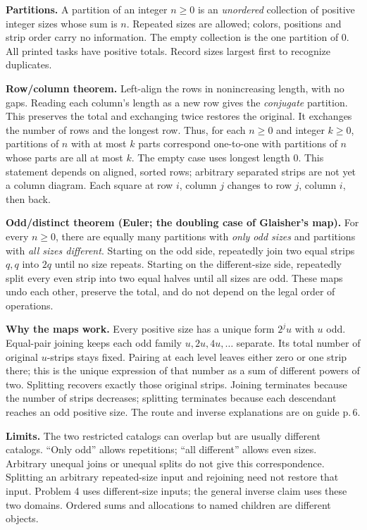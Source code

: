 \documentclass[letterpaper,11pt]{article}
\newcommand{\heading}[1]{\vspace{4pt}{\large\bfseries #1}\par}
\begin{document}
\heading{Mathematical destination: two reversible correspondences}
\textbf{Partitions.} A partition of an integer $n\geq0$ is an \emph{unordered} collection of positive integer sizes whose sum is $n$. Repeated sizes are allowed; colors, positions and strip order carry no information. The empty collection is the one partition of 0. All printed tasks have positive totals. Record sizes largest first to recognize duplicates.

\textbf{Row/column theorem.} Left-align the rows in nonincreasing length, with no gaps. Reading each column's length as a new row gives the \emph{conjugate} partition. This preserves the total and exchanging twice restores the original. It exchanges the number of rows and the longest row. Thus, for each $n\geq0$ and integer $k\geq0$, partitions of $n$ with at most $k$ parts correspond one-to-one with partitions of $n$ whose parts are all at most $k$. The empty case uses longest length 0. This statement depends on aligned, sorted rows; arbitrary separated strips are not yet a column diagram. Each square at row $i$, column $j$ changes to row $j$, column $i$, then back.

\textbf{Odd/distinct theorem (Euler; the doubling case of Glaisher's map).} For every $n\geq0$, there are equally many partitions with \emph{only odd sizes} and partitions with \emph{all sizes different}. Starting on the odd side, repeatedly join two equal strips $q,q$ into $2q$ until no size repeats. Starting on the different-size side, repeatedly split every even strip into two equal halves until all sizes are odd. These maps undo each other, preserve the total, and do not depend on the legal order of operations.

\textbf{Why the maps work.} Every positive size has a unique form $2^j u$ with $u$ odd. Equal-pair joining keeps each odd family $u,2u,4u,\ldots$ separate. Its total number of original $u$-strips stays fixed. Pairing at each level leaves either zero or one strip there; this is the unique expression of that number as a sum of different powers of two. Splitting recovers exactly those original strips. Joining terminates because the number of strips decreases; splitting terminates because each descendant reaches an odd positive size. The route and inverse explanations are on guide p.\,6.

\textbf{Limits.} The two restricted catalogs can overlap but are usually different catalogs. ``Only odd'' allows repetitions; ``all different'' allows even sizes. Arbitrary unequal joins or unequal splits do not give this correspondence. Splitting an arbitrary repeated-size input and rejoining need not restore that input. Problem 4 uses different-size inputs; the general inverse claim uses these two domains. Ordered sums and allocations to named children are different objects.
\end{document}
